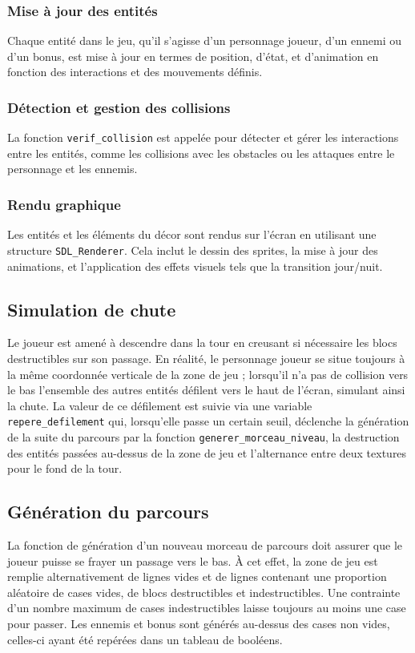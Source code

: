 \documentclass[a4paper,12pt]{article}
\begin{document}
\subsubsection{Mise à jour des entités}
Chaque entité dans le jeu, qu'il s'agisse d'un personnage joueur, d'un ennemi ou d'un bonus, est mise à jour en termes de position, d'état, et d'animation en fonction des interactions et des mouvements définis.
    
\subsubsection{Détection et gestion des collisions}
La fonction \texttt{verif\_collision} est appelée pour détecter et gérer les interactions entre les entités, comme les collisions avec les obstacles ou les attaques entre le personnage et les ennemis.
    
\subsubsection{Rendu graphique}
Les entités et les éléments du décor sont rendus sur l'écran en utilisant une structure \texttt{SDL\_Renderer}. Cela inclut le dessin des sprites, la mise à jour des animations, et l'application des effets visuels tels que la transition jour/nuit.

\subsection{Simulation de chute}

Le joueur est amené à descendre dans la tour en creusant si nécessaire les blocs destructibles sur son passage.
En réalité, le personnage joueur se situe toujours à la même coordonnée verticale de la zone de jeu ; lorsqu’il n’a pas de collision vers le bas l’ensemble des autres entités défilent vers le haut de l’écran, simulant ainsi la chute.
La valeur de ce défilement est suivie via une variable \texttt{repere\_defilement} qui, lorsqu’elle passe un certain seuil, déclenche la génération de la suite du parcours par la fonction \texttt{generer\_morceau\_niveau}, la destruction des entités passées au-dessus de la zone de jeu et l’alternance entre deux textures pour le fond de la tour.

\subsection{Génération du parcours}
La fonction de génération d’un nouveau morceau de parcours doit assurer que le joueur puisse se frayer un passage vers le bas.
À cet effet, la zone de jeu est remplie alternativement de lignes vides et de lignes contenant une proportion aléatoire de cases vides, de blocs destructibles et indestructibles.
Une contrainte d’un nombre maximum de cases indestructibles laisse toujours au moins une case pour passer.
Les ennemis et bonus sont générés au-dessus des cases non vides, celles-ci ayant été repérées dans un tableau de booléens.
\end{document}
